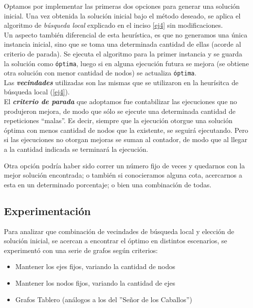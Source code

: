 Optamos por implementar las primeras dos opciones para generar una solución inicial. Una vez obtenida la solución inicial bajo el método deseado, se aplica el algoritmo de \emph{b\'usqueda local} explicado en el inciso \ref{ej4} sin modificaciones.\\

Un aspecto tambi\'en diferencial de esta heur\'istica, es que no generamos una \'unica instancia inicial, sino que se toma una determinada cantidad de ellas (acorde al criterio de parada). Se ejecuta el algoritmo para la primer instancia y se guarda la solución como \texttt{\'optima}, luego si en alguna ejecución futura se mejora (se obtiene otra solución con menor cantidad de nodos) se actualiza \texttt{\'optima}.\\

Las \emph{\textbf{vecindades}} utilizadas son las mismas que se utilizaron en la heur\'isitca de b\'usqueda local (\ref{ej4}).\\

El \emph{\textbf{criterio de parada}} que adoptamos fue contabilizar las ejecuciones que no produjeron mejora, de modo que sólo se ejecute una determinada cantidad de repeticiones ``malas''. Es decir, siempre que la ejecución otorgue una solución óptima con menos cantidad de nodos que la existente, se seguirá ejecutando. Pero si las ejecuciones no otorgan mejoras se suman al contador, de modo que al llegar a la cantidad indicada se terminará la ejecución.

Otra opci\'on podr\'ia haber sido correr un n\'umero fijo de veces y quedarnos con la mejor soluci\'on encontrada; o tambi\'en si conocieramos alguna cota, acercarnos a esta en un determinado porcentaje; o bien una combinaci\'on de todas.


\newpage
\subsection{Experimentaci\'on}

Para analizar que combinaci\'on de vecindades de b\'usqueda local y elecci\'on de soluci\'on inicial, se acercan a encontrar el \'optimo en distintos escenarios, se experiment\'o con una serie de grafos seg\'un criterios:
\begin{itemize}
	\item Mantener los ejes fijos, variando la cantidad de nodos
	\item Mantener los nodos fijos, variando la cantidad de ejes
	\item Grafos Tablero (an\'alogos a los del ''Se\~nor de los Caballos'')
\end{itemize}


